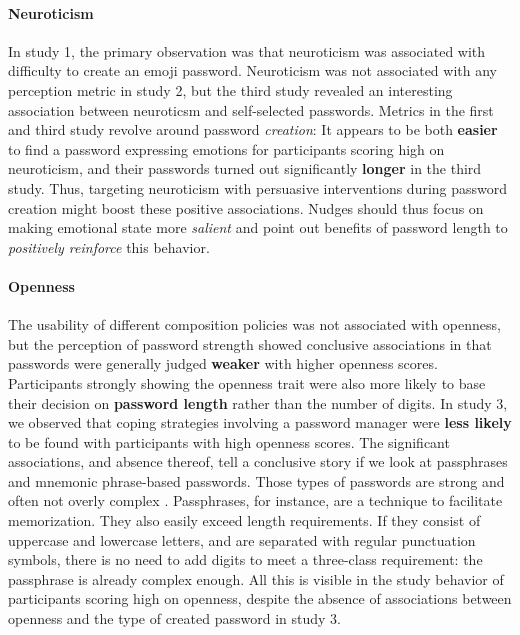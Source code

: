 \paragraph{Neuroticism} In study 1, the primary observation was that neuroticism was associated with difficulty to create an emoji password. Neuroticism was not associated with any perception metric in study 2, but the third study revealed an interesting association between neuroticsm and self-selected passwords. Metrics in the first and third study revolve around password \textit{creation}: It appears to be both \textbf{easier} to find a password expressing emotions for participants scoring high on neuroticism, and their passwords turned out significantly \textbf{longer} in the third study. 
Thus, targeting neuroticism with persuasive interventions during password creation might boost these positive associations. Nudges should thus focus on making emotional state more \textit{salient} and point out benefits of password length to \textit{positively reinforce} this behavior. 

\paragraph{Openness} The usability of different composition policies was not associated with openness, but the perception of password strength showed conclusive associations in that passwords were generally judged \textbf{weaker} with higher openness scores. Participants strongly showing the openness trait were also more likely to base their decision on \textbf{password length} rather than the number of digits. In study 3, we observed that coping strategies involving a password manager were \textbf{less likely} to be found with participants with high openness scores. 
The significant associations, and absence thereof, tell a conclusive story if we look at passphrases and mnemonic phrase-based passwords. Those types of passwords are strong and often not overly complex \cite{Keith2009PassphraseDesign,Kuo2006HumanSelectionMnemonic,Shay2012CorrectHorseBatteryStaple}. Passphrases, for instance, are a technique to facilitate memorization. They also easily exceed length requirements. If they consist of uppercase and lowercase letters, and are separated with regular punctuation symbols, there is no need to add digits to meet a three-class requirement: the passphrase is already complex enough. All this is visible in the study behavior of participants scoring high on openness, despite the absence of associations between openness and the type of created password in study 3. 

